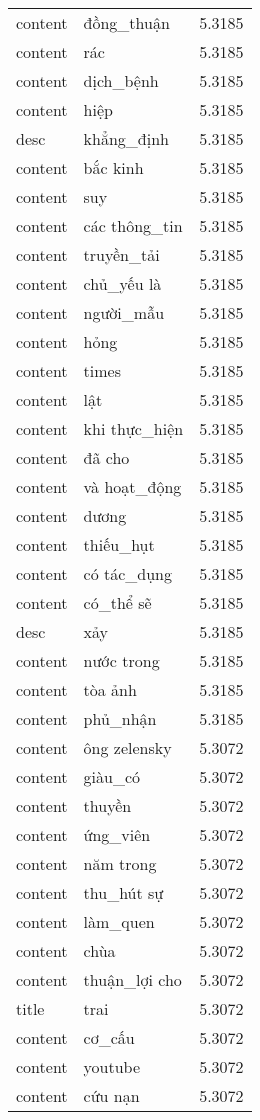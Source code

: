 \documentclass{article}
\begin{document}
\begin{tabular}{lll}
content & đồng\_thuận & 5.3185\\
content & rác & 5.3185\\
content & dịch\_bệnh & 5.3185\\
content & hiệp & 5.3185\\
desc & khẳng\_định & 5.3185\\
content & bắc kinh & 5.3185\\
content & suy & 5.3185\\
content & các thông\_tin & 5.3185\\
content & truyền\_tải & 5.3185\\
content & chủ\_yếu là & 5.3185\\
content & người\_mẫu & 5.3185\\
content & hỏng & 5.3185\\
content & times & 5.3185\\
content & lật & 5.3185\\
content & khi thực\_hiện & 5.3185\\
content & đã cho & 5.3185\\
content & và hoạt\_động & 5.3185\\
content & dương & 5.3185\\
content & thiếu\_hụt & 5.3185\\
content & có tác\_dụng & 5.3185\\
content & có\_thể sẽ & 5.3185\\
desc & xảy & 5.3185\\
content & nước trong & 5.3185\\
content & tòa ảnh & 5.3185\\
content & phủ\_nhận & 5.3185\\
content & ông zelensky & 5.3072\\
content & giàu\_có & 5.3072\\
content & thuyền & 5.3072\\
content & ứng\_viên & 5.3072\\
content & năm trong & 5.3072\\
content & thu\_hút sự & 5.3072\\
content & làm\_quen & 5.3072\\
content & chùa & 5.3072\\
content & thuận\_lợi cho & 5.3072\\
title & trai & 5.3072\\
content & cơ\_cấu & 5.3072\\
content & youtube & 5.3072\\
content & cứu nạn & 5.3072\\

\end{tabular}
\end{document}
